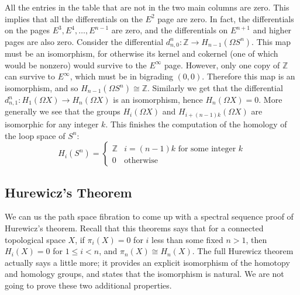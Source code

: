 All the entries in the table that are not in the two main columns are zero. This implies that all the differentials on the $E^2$ page are zero. In fact, the differentials on the pages $E^3, E^4, \ldots, E^{n-1}$ are zero, and the differentials on $E^{n+1}$ and higher pages are also zero. Consider the differential $d_{n,0}^n : \mathbb Z \rightarrow H_{n-1}(\Omega S^n)$. This map must be an isomorphism, for otherwise its kernel and cokernel (one of which would be nonzero) would survive to the $E^\infty$ page. However, only one copy of $\mathbb Z$ can survive to $E^\infty$, which must be in bigrading $(0,0)$. Therefore this map is an isomorphism, and so $H_{n-1}(\Omega S^n) \cong \mathbb Z$. Similarly we get that the differential $d_{n,1}^n : H_1(\Omega X) \rightarrow H_n(\Omega X)$ is an isomorphism, hence $H_n(\Omega X) = 0$. More generally we see that the groups $H_i(\Omega X)$ and $H_{i+(n-1)k}(\Omega X)$ are isomorphic for any integer $k$. This finishes the computation of the homology of the loop space of $S^n$:
\[ H_i(S^n) = \begin{cases} \mathbb Z & i = (n-1)k \text{ for some integer } k \\ 0 & \text{otherwise} \end{cases} \]




\subsection{Hurewicz's Theorem}
\label{Hurewicz's Theorem Discussion}

We can us the path space fibration to come up with a spectral sequence proof of Hurewicz's theorem. Recall that this theorems says that for a connected topological space $X$, if $\pi_i(X) = 0$ for $i$ less than some fixed $n>1$, then $H_i(X) = 0$ for $1 \leq i < n$, and $\pi_n(X) \cong H_n(X)$. The full Hurewicz theorem actually says a little more; it provides an explicit isomorphism of the homotopy and homology groups, and states that the isomorphism is natural. We are not going to prove these two additional properties.

